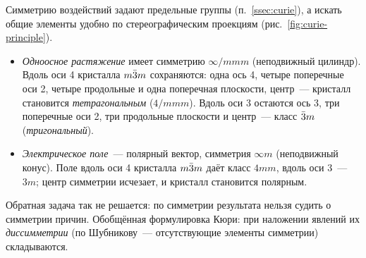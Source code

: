 Симметрию воздействий задают предельные группы (п.~\ref{ssec:curie}), а
искать общие элементы удобно по стереографическим проекциям
(рис.~\ref{fig:curie-principle}).
\begin{itemize}
\item \emph{Одноосное растяжение} имеет симметрию $\infty/mmm$
(неподвижный цилиндр). Вдоль оси 4 кристалла $m\bar{3}m$ сохраняются: одна ось
4, четыре поперечные оси 2, четыре продольные и одна поперечная
плоскости, центр~— кристалл становится \emph{тетрагональным} ($4/mmm$).
Вдоль оси 3 остаются ось 3, три поперечные оси 2, три продольные
плоскости и центр~— класс $\bar{3}m$ (\emph{тригональный}).
\item \emph{Электрическое поле}~— полярный вектор, симметрия $\infty m$
(неподвижный конус). Поле вдоль оси 4 кристалла $m\bar{3}m$ даёт класс $4mm$,
вдоль оси 3~— $3m$; центр симметрии исчезает, и кристалл становится
полярным.
\end{itemize}
Обратная задача так не решается: по симметрии результата нельзя судить о
симметрии причин. Обобщённая формулировка Кюри: при наложении явлений
их \emph{диссимметрии} (по Шубникову~— отсутствующие элементы симметрии)
складываются.

